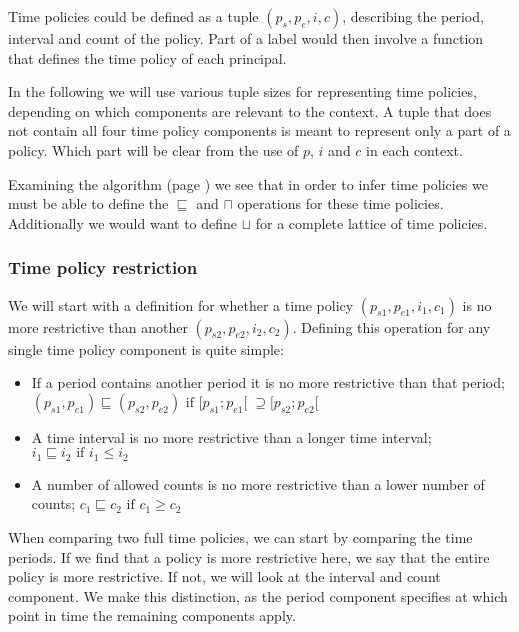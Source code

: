 Time policies could be defined as a tuple $(p_s, p_e, i, c)$, describing the period, interval and count of the policy.
Part of a label would then involve a function that defines the time policy of each principal.

In the following we will use various tuple sizes for representing time policies, depending on which components are relevant to the context.
A tuple that does not contain all four time policy components is meant to represent only a part of a policy.
Which part will be clear from the use of $p$, $i$ and $c$ in each context.

Examining the algorithm (page \pageref{dlm:inf:algorithm}) we see that in order to infer time policies we must be able to define the $\sqsubseteq$ and $\sqcap$ operations for these time policies.
Additionally we would want to define $\sqcup$ for a complete lattice of time policies.

\subsubsection{Time policy restriction}\label{time:restriction}
We will start with a definition for whether a time policy $(p_{s1}, p_{e1}, i_1, c_1)$ is no more restrictive than another $(p_{s2}, p_{e2}, i_2, c_2)$.
Defining this operation for any single time policy component is quite simple:
\begin{itemize}
  \item If a period contains another period it is no more restrictive than that period; \\
  $(p_{s1}, p_{e1}) \sqsubseteq (p_{s2}, p_{e2}) \text{ if } [p_{s1}; p_{e1}[ \; \supseteq [p_{s2}; p_{e2}[$
  \item A time interval is no more restrictive than a longer time interval; \\
  $i_1 \sqsubseteq i_2 \text{ if } i_1 \leq i_2$
  \item A number of allowed counts is no more restrictive than a lower number of counts;
  $c_1 \sqsubseteq c_2 \text{ if } c_1 \geq c_2$
\end{itemize}

When comparing two full time policies, we can start by comparing the time periods.
If we find that a policy is more restrictive here, we say that the entire policy is more restrictive.
If not, we will look at the interval and count component.
We make this distinction, as the period component specifies at which point in time the remaining components apply.

